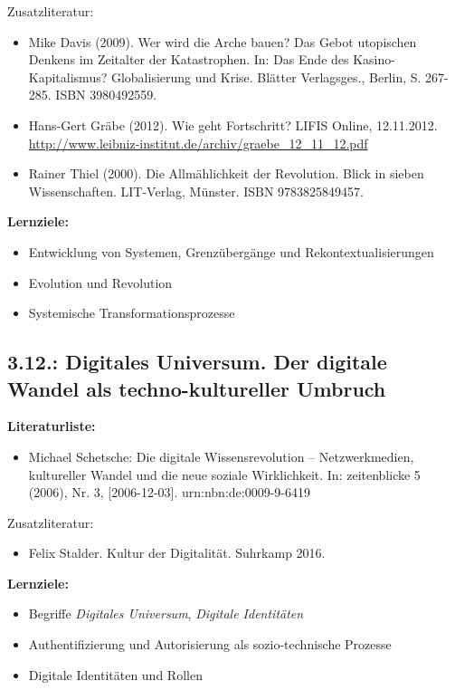 \documentclass[11pt,a4paper]{article}
\begin{document}
Zusatzliteratur:
\begin{itemize}[noitemsep]
\item Mike Davis (2009).  Wer wird die Arche bauen? Das Gebot utopischen
  Denkens im Zeitalter der Katastrophen.  In: Das Ende des
  Kasino-Kapitalismus?  Globalisierung und Krise. Blätter
  Verlagsges., Berlin, S. 267-285. ISBN 3980492559. 
\item Hans-Gert Gräbe (2012). Wie geht Fortschritt? LIFIS Online,
  12.11.2012.\\ 
  \url{http://www.leibniz-institut.de/archiv/graebe_12_11_12.pdf}
\item Rainer Thiel (2000). Die Allmählichkeit der Revolution. Blick in sieben
  Wissenschaften.  LIT-Verlag, Münster. ISBN 9783825849457. 
\end{itemize}

\textbf{Lernziele:}
\begin{itemize}[noitemsep]
\item Entwicklung von Systemen, Grenzübergänge und Rekontextualisierungen 
\item Evolution und Revolution
\item Systemische Transformationsprozesse
\end{itemize}

\subsection{3.12.: Digitales Universum. Der digitale Wandel als
  techno-kultureller Umbruch}

\textbf{Literaturliste:}
\begin{itemize}[noitemsep]
\item Michael Schetsche: Die digitale Wissensrevolution – Netzwerkmedien,
  kultureller Wandel und die neue soziale Wirklichkeit. In: zeitenblicke 5
  (2006), Nr. 3, [2006-12-03]. urn:nbn:de:0009-9-6419
\end{itemize}
Zusatzliteratur:
\begin{itemize}[noitemsep]
\item Felix Stalder. Kultur der Digitalität. Suhrkamp 2016.
\end{itemize}

\textbf{Lernziele:}
\begin{itemize}[noitemsep]
\item Begriffe \emph{Digitales Universum}, \emph{Digitale Identitäten}
\item Authentifizierung und Autorisierung als sozio-technische Prozesse
\item Digitale Identitäten und Rollen
\end{itemize}
\end{document}
